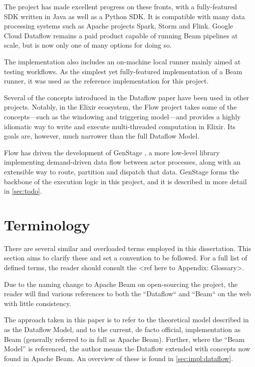 The project has made excellent progress on these fronts, with a fully-featured SDK written in Java as well as a Python SDK.
It is compatible with many data processing systems such as Apache projects Spark, Storm and Flink.
Google Cloud Dataflow remains a paid product capable of running Beam pipelines at scale, but is now only one of many options for doing so.

The implementation also includes an on-machine local runner mainly aimed at testing workflows.
As the simplest yet fully-featured implementation of a Beam runner, it was used as the reference implementation for this project.

Several of the concepts introduced in the Dataflow paper have been used in other projects.
Notably, in the Elixir ecosystem, the Flow project \cite{ElixirFlow} takes some of the concepts---such as the windowing and triggering model---and provides a highly idiomatic way to write and execute multi-threaded computation in Elixir.
Its goals are, however, much narrower than the full Dataflow Model.

Flow has driven the development of GenStage \cite{ElixirGenStage}, a more low-level library implementing demand-driven data flow between actor processes, along with an extensible way to route, partition and dispatch that data.
GenStage forms the backbone of the execution logic in this project, and it is described in more detail in \cref{sec:todo}.

\section{Terminology}\label{sec:intro:terminology}

There are several similar and overloaded terms employed in this dissertation.
This section aims to clarify these and set a convention to be followed.
For a full list of defined terms, the reader should consult the <ref here to Appendix: Glossary>.

Due to the naming change to Apache Beam on open-sourcing the project, the reader will find various references to both the ``Dataflow`` and ``Beam`` on the web with little consistency.

The approach taken in this paper is to refer to the theoretical model described in \cite{Akidau:2015} as the Dataflow Model, and to the current, de facto official, implementation \cite{ApacheBeam} as Beam (generally referred to in full as Apache Beam).
Further, where the ``Beam Model'' is referenced, the author means the Dataflow extended with concepts now found in Apache Beam.
An overview of these is found in \cref{sec:impl:dataflow}.

